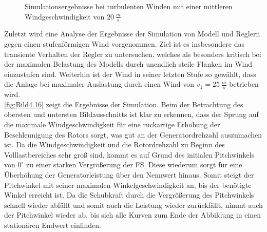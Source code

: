 \begin{figure}[H]
   \centering
   \caption[Simulationsergebnisse bei schnellen turbulenten Winden]{Simulationsergebnisse bei turbulenten Winden mit einer mittleren Windgeschwindigkeit von $\SI{20}{\frac{m}{s}}$}
   \label{fig:Bild4.15}
\end{figure}


Zuletzt wird eine Analyse der Ergebnisse der Simulation von Modell und Reglern gegen einen stufenförmigen Wind vorgenommen. Ziel ist es insbesondere das transiente Verhalten der Regler zu untersuchen, welches als besonders kritisch bei der maximalen Belastung des Modells durch unendlich steile Flanken im Wind einzustufen sind. Weiterhin ist der Wind in seiner letzten Stufe so gewählt, dass die Anlage bei maximaler Auslastung durch einen Wind von $v_1 = \SI{25}{\frac{m}{s}}$ betrieben wird.\\
\autoref{fig:Bild4.16} zeigt die Ergebnisse der Simulation. Beim der Betrachtung des obersten und untersten Bildausschnitts ist klar zu erkennen, dass der Sprung auf die maximale Windgeschwindigkeit für eine ruckartige Erhöhung der Beschleunigung des Rotors sorgt, was gut an der Generatordrehzahl auszumachen ist. Da die Windgeschwindigkeit und die Rotordrehzahl zu Beginn des Volllastbereiches sehr groß sind, kommt es auf Grund des initialen Pitchwinkels von $0^\circ$ zu einer starken Vergrößerung der \ac{FS}. Diese wiederum sorgt für eine Überhöhung der Generatorleistung über den Nennwert hinaus. Somit steigt der Pitchwinkel mit seiner maximalen Winkelgeschwindigkeit an, bis der benötigte Winkel erreicht ist. Da die Schubkraft durch die Vergrößerung des Pitchwinkels schnell wieder abfällt und somit auch die Leistung wieder zurückfällt, nimmt auch der Pitchwinkel wieder ab, bis sich alle Kurven zum Ende der Abbildung in einen stationären Endwert einfinden.


